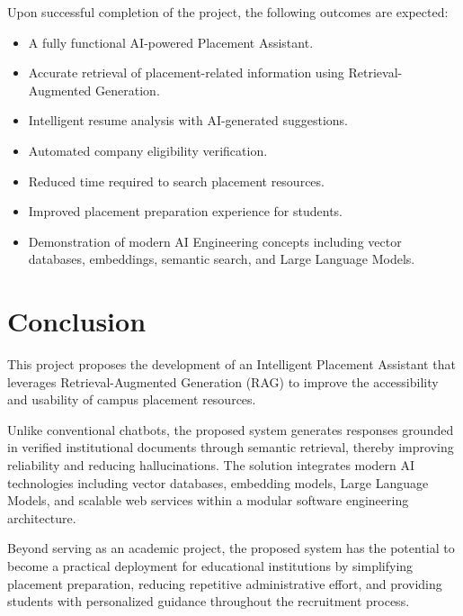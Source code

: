 \documentclass[11pt]{article}
\begin{document}
Upon successful completion of the project, the following outcomes are expected:

\begin{itemize}

\item A fully functional AI-powered Placement Assistant.

\item Accurate retrieval of placement-related information using Retrieval-Augmented Generation.

\item Intelligent resume analysis with AI-generated suggestions.

\item Automated company eligibility verification.

\item Reduced time required to search placement resources.

\item Improved placement preparation experience for students.

\item Demonstration of modern AI Engineering concepts including vector databases, embeddings, semantic search, and Large Language Models.

\end{itemize}


\section{Conclusion}

This project proposes the development of an Intelligent Placement Assistant that leverages Retrieval-Augmented Generation (RAG) to improve the accessibility and usability of campus placement resources.

Unlike conventional chatbots, the proposed system generates responses grounded in verified institutional documents through semantic retrieval, thereby improving reliability and reducing hallucinations. The solution integrates modern AI technologies including vector databases, embedding models, Large Language Models, and scalable web services within a modular software engineering architecture.

Beyond serving as an academic project, the proposed system has the potential to become a practical deployment for educational institutions by simplifying placement preparation, reducing repetitive administrative effort, and providing students with personalized guidance throughout the recruitment process.
\end{document}

